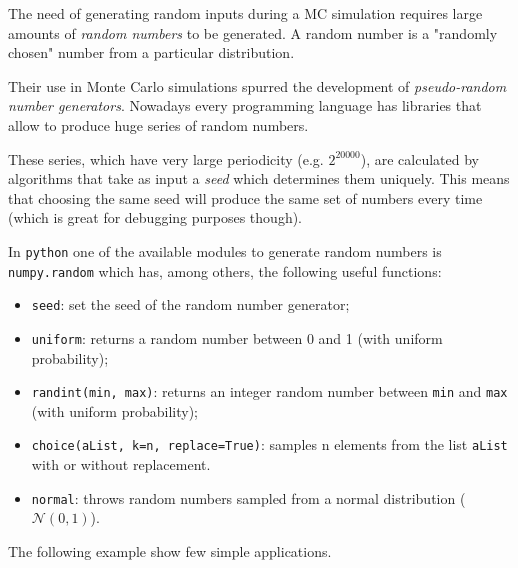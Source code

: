 The need of generating random inputs during a MC simulation requires large amounts of \emph{random numbers} to be generated.
A random number is a "randomly chosen" number from a particular distribution.

Their use in Monte Carlo simulations spurred the development of \emph{pseudo-random number generators}. Nowadays every programming language has libraries that allow to produce huge series of random numbers. 

These series, which have very large periodicity (e.g. \(2^{20000}\)), are calculated by algorithms that take as input a \emph{seed} which determines them uniquely. This means that choosing the same seed will produce the same set of numbers every time (which is great for debugging purposes though).

In \texttt{python} one of the available modules to generate random numbers is \texttt{numpy.random} which has, among others, the following useful functions:
\begin{itemize}
\tightlist
\item \texttt{seed}: set the seed of the random number generator;
\item \texttt{uniform}: returns a random number between 0 and 1 (with uniform probability);
\item \texttt{randint(min,\ max)}: returns an integer random number between \texttt{min} and \texttt{max} (with uniform probability);
\item \texttt{choice(aList,\ k=n, replace=True)}: samples n elements from the list \texttt{aList} with or without replacement.
\item \texttt{normal}: throws random numbers sampled from a normal distribution ($\mathcal{N}(0, 1)$).
\end{itemize}

The following example show few simple applications.

